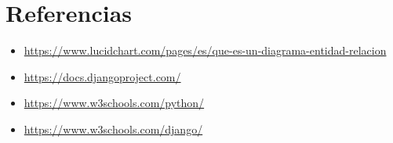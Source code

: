 \documentclass{article}
\begin{document}
\clearpage

\section{Referencias}
\begin{itemize}			
	\item \url{https://www.lucidchart.com/pages/es/que-es-un-diagrama-entidad-relacion}
	\item \url{https://docs.djangoproject.com/}
	\item \url{https://www.w3schools.com/python/}
	\item \url{https://www.w3schools.com/django/}

\end{itemize}	
	
%
%
%
			
\end{document}
